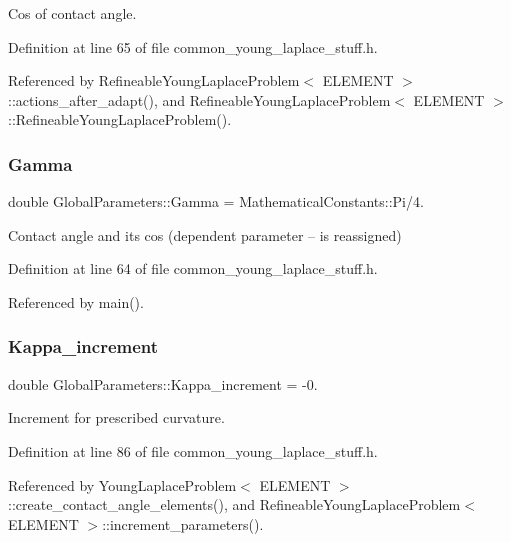 Cos of contact angle. 



Definition at line 65 of file common\+\_\+young\+\_\+laplace\+\_\+stuff.\+h.



Referenced by Refineable\+Young\+Laplace\+Problem$<$ E\+L\+E\+M\+E\+N\+T $>$\+::actions\+\_\+after\+\_\+adapt(), and Refineable\+Young\+Laplace\+Problem$<$ E\+L\+E\+M\+E\+N\+T $>$\+::\+Refineable\+Young\+Laplace\+Problem().

\mbox{\label{namespaceGlobalParameters_adb0a994119055242fcc762cac5edc317}} 
\subsubsection{\texorpdfstring{Gamma}{Gamma}}
{\footnotesize\ttfamily double Global\+Parameters\+::\+Gamma = Mathematical\+Constants\+::\+Pi/4.}



Contact angle and its cos (dependent parameter -- is reassigned) 



Definition at line 64 of file common\+\_\+young\+\_\+laplace\+\_\+stuff.\+h.



Referenced by main().

\mbox{\label{namespaceGlobalParameters_a74cc88d6dc206cd556fb12e7e3101032}} 
\subsubsection{\texorpdfstring{Kappa\+\_\+increment}{Kappa\_increment}}
{\footnotesize\ttfamily double Global\+Parameters\+::\+Kappa\+\_\+increment = -\/0.}



Increment for prescribed curvature. 



Definition at line 86 of file common\+\_\+young\+\_\+laplace\+\_\+stuff.\+h.



Referenced by Young\+Laplace\+Problem$<$ E\+L\+E\+M\+E\+N\+T $>$\+::create\+\_\+contact\+\_\+angle\+\_\+elements(), and Refineable\+Young\+Laplace\+Problem$<$ E\+L\+E\+M\+E\+N\+T $>$\+::increment\+\_\+parameters().

